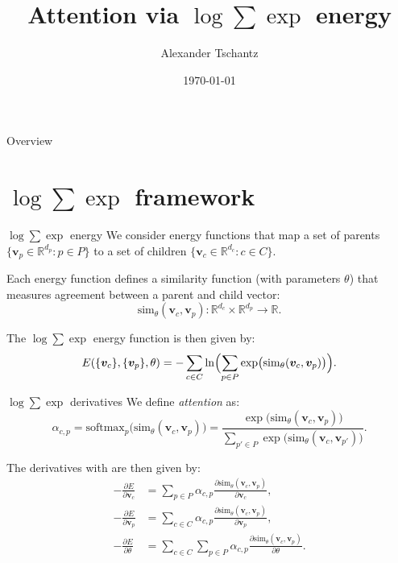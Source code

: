 \documentclass{beamer}
\title{Attention via $\log \sum \exp$ energy}
\author{Alexander Tschantz}
\date{\today}
\begin{document}
\begin{frame}
  \titlepage
\end{frame}

\begin{frame}{Overview}
\tableofcontents
\end{frame}

\section{$\log \sum \exp$ framework}

\begin{frame}{$\log \sum \exp$ energy}
    \large
    We consider energy functions that map a set of parents \(\{\bm{v}_p \in \mathbb{R}^{d_p} : p \in P\}\) to a set of children \(\{\bm{v}_c \in \mathbb{R}^{d_c} : c \in C\}\). 
    
    \bigskip

    Each energy function defines a similarity function (with parameters $\theta$) that measures agreement between a parent and child vector:
    \[
    \mathrm{sim}_\theta(\bm{v}_c, \bm{v}_p) : \mathbb{R}^{d_c} \times \mathbb{R}^{d_p} \to \mathbb{R}.
    \]
    
    \bigskip

    The $\log \sum \exp$ energy function is then given by:
    \[
    E(\{\bm{v}_c\}, \{\bm{v}_p\}, \theta) = -\sum_{c \in C} \ln \Bigl(\sum_{p \in P} \exp\bigl(\mathrm{sim}_\theta(\bm{v}_c, \bm{v}_p)\bigr)\Bigr).
    \]
\end{frame}
    

\begin{frame}{$\log \sum \exp$ derivatives}
    We define \emph{attention} as:
    \[
    \alpha_{c,p} = \text{softmax}_p\bigl(\mathrm{sim}_\theta(\bm{v}_c, \bm{v}_p)\bigr) = \frac{\exp\bigl(\mathrm{sim}_\theta(\bm{v}_c, \bm{v}_p)\bigr)}{\sum_{p' \in P} \exp\bigl(\mathrm{sim}_\theta(\bm{v}_c, \bm{v}_{p'})\bigr)}.
    \]
    
    The derivatives with are then given by:
    \[
    \begin{aligned}
        -\frac{\partial E}{\partial \bm{v}_c} &= \sum_{p \in P} \alpha_{c,p} \frac{\partial \mathrm{sim}_\theta(\bm{v}_c, \bm{v}_p)}{\partial \bm{v}_c}, \\
        -\frac{\partial E}{\partial \bm{v}_p} &= \sum_{c \in C} \alpha_{c,p} \frac{\partial \mathrm{sim}_\theta(\bm{v}_c, \bm{v}_p)}{\partial \bm{v}_p}, \\
        -\frac{\partial E}{\partial \theta} &= \sum_{c \in C} \sum_{p \in P} \alpha_{c,p} \frac{\partial \mathrm{sim}_\theta(\bm{v}_c, \bm{v}_p)}{\partial \theta}.
    \end{aligned}
    \]
\end{frame}
\end{document}

